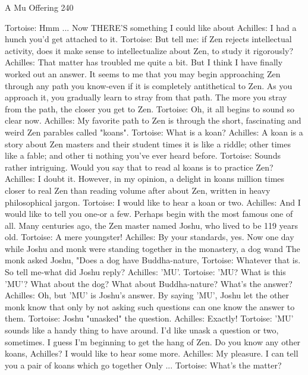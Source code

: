 A Mu Offering                                                                          240

Tortoise: Hmm ... Now THERE'S something I could like about Achilles: I had a hunch
   you'd get attached to it.
Tortoise: But tell me: if Zen rejects intellectual activity, does it make sense to
   intellectualize about Zen, to study it rigorously?
Achilles: That matter has troubled me quite a bit. But I think I have finally worked out an
   answer. It seems to me that you may begin approaching Zen through any path you
   know-even if it is completely antithetical to Zen. As you approach it, you gradually
   learn to stray from that path. The more you stray from the path, the closer you get to
   Zen.
Tortoise: Oh, it all begins to sound so clear now.
Achilles: My favorite path to Zen is through the short, fascinating and weird Zen parables
   called "koans".
Tortoise: What is a koan?
Achilles: A koan is a story about Zen masters and their student times it is like a riddle;
   other times like a fable; and other ti nothing you've ever heard before.
Tortoise: Sounds rather intriguing. Would you say that to read al koans is to practice
   Zen?
Achilles: I doubt it. However, in my opinion, a delight in koans million times closer to
   real Zen than reading volume after about Zen, written in heavy philosophical jargon.
Tortoise: I would like to hear a koan or two.
Achilles: And I would like to tell you one-or a few. Perhaps begin with the most famous
   one of all. Many centuries ago, the Zen master named Joshu, who lived to be 119
   years old.
Tortoise: A mere youngster!
Achilles: By your standards, yes. Now one day while Joshu and monk were standing
   together in the monastery, a dog wand The monk asked Joshu, "Does a dog have
   Buddha-nature,
Tortoise: Whatever that is. So tell me-what did Joshu reply?
Achilles: 'MU'.
Tortoise: 'MU? What is this 'MU'? What about the dog? What about Buddha-nature?
   What's the answer?
Achilles: Oh, but 'MU' is Joshu's answer. By saying 'MU', Joshu let the other monk know
   that only by not asking such questions can one know the answer to them.
Tortoise: Joshu "unasked" the question.
Achilles: Exactly!
Tortoise: 'MU' sounds like a handy thing to have around. I'd like unask a question or two,
   sometimes. I guess I'm beginning to get the hang of Zen. Do you know any other
   koans, Achilles? I would like to hear some more.
Achilles: My pleasure. I can tell you a pair of koans which go together
   Only ...
Tortoise: What's the matter?




